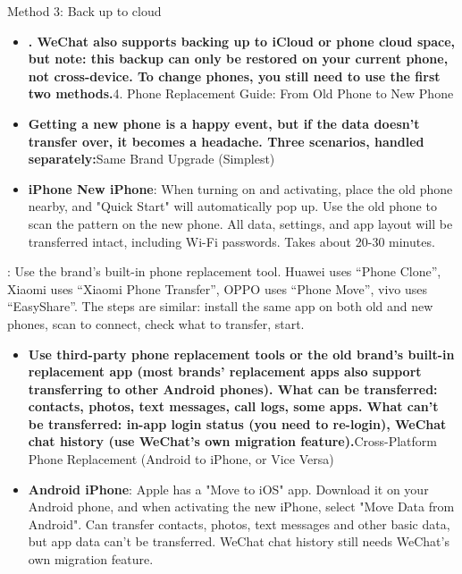 
Method 3: Back up to cloud

\begin{itemize}
  \item \textbf{. WeChat also supports backing up to iCloud or phone cloud space, but note: this backup can only be restored on your current phone, not cross-device. To change phones, you still need to use the first two methods.}4. Phone Replacement Guide: From Old Phone to New Phone
  \item \textbf{Getting a new phone is a happy event, but if the data doesn't transfer over, it becomes a headache. Three scenarios, handled separately:}Same Brand Upgrade (Simplest)
  \item \textbf{iPhone New iPhone}: When turning on and activating, place the old phone nearby, and "Quick Start" will automatically pop up. Use the old phone to scan the pattern on the new phone. All data, settings, and app layout will be transferred intact, including Wi-Fi passwords. Takes about 20-30 minutes.
\end{itemize}


: Use the brand's built-in phone replacement tool. Huawei uses “Phone Clone”, Xiaomi uses “Xiaomi Phone Transfer”, OPPO uses “Phone Move”, vivo uses “EasyShare”. The steps are similar: install the same app on both old and new phones, scan to connect, check what to transfer, start.


\begin{itemize}
  \item \textbf{Use third-party phone replacement tools or the old brand's built-in replacement app (most brands' replacement apps also support transferring to other Android phones). What can be transferred: contacts, photos, text messages, call logs, some apps. What can't be transferred: in-app login status (you need to re-login), WeChat chat history (use WeChat's own migration feature).}Cross-Platform Phone Replacement (Android to iPhone, or Vice Versa)
  \item \textbf{Android iPhone}: Apple has a "Move to iOS" app. Download it on your Android phone, and when activating the new iPhone, select "Move Data from Android". Can transfer contacts, photos, text messages and other basic data, but app data can't be transferred. WeChat chat history still needs WeChat's own migration feature.
\end{itemize}

